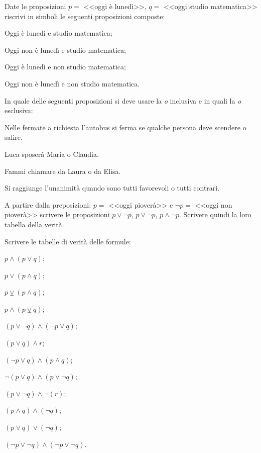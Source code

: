 \begin{esercizio}[\Ast]
\label{ese:6.5}
Date le proposizioni $ p = $ <<oggi è lunedì>>, $ q = $ <<oggi studio matematica>>
riscrivi in simboli le seguenti proposizioni composte:
\begin{enumeratea}
\item Oggi è lunedì e studio matematica;
\item Oggi non è lunedì e studio matematica;
\item Oggi è lunedì e non studio matematica;
\item Oggi non è lunedì e non studio matematica.
\end{enumeratea}
\end{esercizio}

\begin{esercizio}
\label{ese:6.6}
In quale delle seguenti proposizioni si deve usare la \emph{o} inclusiva e
in quali la \emph{o} esclusiva:
\begin{enumeratea}
\item Nelle fermate a richiesta l'autobus si ferma se qualche persona deve scendere o salire.
\item Luca sposerà Maria o Claudia.
\item Fammi chiamare da Laura o da Elisa.
\item Si raggiunge l’unanimità quando sono tutti favorevoli o tutti
contrari.
\end{enumeratea}
\end{esercizio}

\begin{esercizio}
\label{ese:6.7}
A partire dalla preposizioni: $ p = $ <<oggi pioverà>> e  $\neg p =$ <<oggi
non pioverà>> scrivere le proposizioni  $p\veebar \neg p$, $p\vee \neg p$, $p\wedge \neg
p$. Scrivere quindi la loro tabella della verità.
\end{esercizio}

\begin{esercizio}
\label{ese:6.8}
Scrivere le tabelle di verità delle formule:
 \begin{multicols}{3}
 \begin{enumeratea}
 \item $p\wedge (p\vee q)$;
 \item $p\vee (p\wedge q)$;
 \item $p\veebar(p\wedge q)$;
 \item $p\wedge (p\veebar q)$;
 \item $(p\vee \neg q)\wedge (\neg p\vee q)$;
 \item $(p\vee q)\wedge r$;
 \item $(\neg p\vee q)\wedge (p\wedge q)$;
 \item $\neg (p\vee q)\wedge (p\vee \neg q)$;
 \item $(p\vee \neg q)\wedge \neg (r)$;
 \item $(p\wedge q)\wedge (\neg q)$;
 \item $(p\vee q)\vee (\neg q)$;
 \item $(\neg p\vee \neg q)\wedge (\neg p\vee \neg q)$.
 \end{enumeratea}
 \end{multicols}
\end{esercizio}

